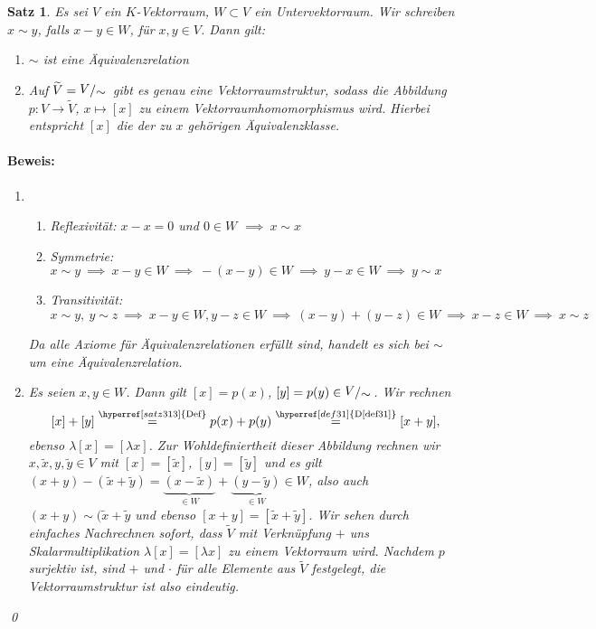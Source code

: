 \documentclass{report}
\newcommand{\lb}{\lambda}
\theoremstyle{customrem}
\theoremstyle{customdef}
\newtheorem{satz}[definition]{Satz}
\renewenvironment{proof}{\paragraph{Beweis: }}{\qed}
\newcommand{\bigslant}[2]{{\raisebox{.1em}{$#1$}\hspace{-.2em}\left/\raisebox{-.1em}{$#2$}\right.}}
\begin{document}
	\begin{satz}
		\label{satz313}
		Es sei $V$ ein $K$-Vektorraum, $W\subset V$ ein Untervektorraum. Wir schreiben $x \sim y$, falls $x-y\in W$, für $x, y\in V$. Dann gilt:
		
		\begin{enumerate}
			\item[i)] $\sim$ ist eine Äquivalenzrelation
			\item[ii)] Auf $\widetilde{V} = \bigslant{V}{\sim}$ gibt es genau eine Vektorraumstruktur, sodass die Abbildung $p:V\to \widetilde{V}$, $x\mapsto [x]$ zu einem Vektorraumhomomorphismus wird. Hierbei entspricht $[x]$ die der zu $x$ gehörigen Äquivalenzklasse.
		\end{enumerate}
		
		\begin{proof}
			\begin{enumerate}
				\item[i)]
				\begin{enumerate}
					\item \textit{Reflexivität}: $x-x=0$ und $0\in W$ $\implies\ x\sim x$
					\item \textit{Symmetrie}: $x\sim y\ \implies\ x-y\in W\ \implies\ -(x-y)\in W\ \implies\ y-x\in W\ \implies\ y\sim x$
					\item \textit{Transitivität}: $x\sim y,\ y\sim z\ \implies\ x-y\in W, y-z\in W\ \implies\ (x-y)+(y-z)\in W\ \implies\ x-z\in W\ \implies\ x\sim z$
				\end{enumerate}
				Da alle Axiome für Äquivalenzrelationen erfüllt sind, handelt es sich bei $\sim$ um eine Äquivalenzrelation.
				\item[ii)] Es seien $x,y\in W$. Dann gilt $[x]=p(x)$, $[y] = p(y)\in \bigslant{V}{\sim}$. Wir rechnen 
				$$[x] + [y] \stackrel{\hyperref[satz313]{\text{Def}}}{=} p(x)+ p(y) \stackrel{\hyperref[def31]{\text{D\ref*{def31}}}}{=} [x+y],$$
				ebenso $\lb[x] = [\lb x]$. Zur Wohldefiniertheit dieser Abbildung rechnen wir $x, \widetilde{x}, y, \widetilde{y}\in V$ mit $[x]=[\widetilde{x}]$, $[y]=[\widetilde{y}]$ und es gilt $(x+y)-(\widetilde{x}+\widetilde{y}) = \underbrace{(x-\widetilde{x})}_{\in W} + \underbrace{(y-\widetilde{y})}_{\in W}\in W$, also auch $(x+y)\sim (\widetilde{x}+\widetilde{y}$ und ebenso $[x+y] = [\widetilde{x}+\widetilde{y}]$. Wir sehen durch einfaches Nachrechnen sofort, dass $\widetilde{V}$ mit Verknüpfung $+$ uns Skalarmultiplikation $\lb[x] = [\lb x]$ zu einem Vektorraum wird.
				Nachdem $p$ surjektiv ist, sind $+$ und $\cdot$ für alle Elemente aus $\widetilde{V}$ festgelegt, die Vektorraumstruktur ist also eindeutig.
			\end{enumerate}
		\end{proof}
	\end{satz}
	
\end{document}
